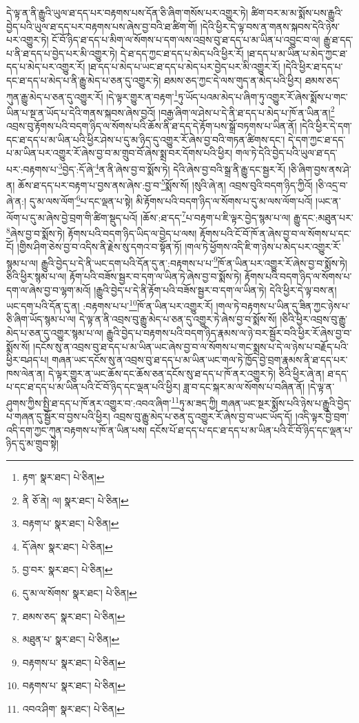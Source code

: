 དེ་ལྟ་ན་ནི་རྒྱུའི་ཡུལ་ཐ་དད་པར་བརྟགས་པས་དོན་ཅི་ཞིག་གསོས་པར་འགྱུར་ཏེ། ཚིག་བར་མ་མ་སྨོས་པས་རྒྱུའི་བྱེད་པའི་ཡུལ་ཐ་དད་པར་བརྟགས་པས་ཞེས་བྱ་བའི་ཐ་ཚིག་གོ། །དེའི་ཕྱིར་དེ་ལྟ་བས་ན་གནས་སྐབས་དེའི་ཉེས་པར་འགྱུར་ཏེ། ངོ་བོ་ཉིད་ཐ་དད་པ་མིག་ལ་སོགས་པ་དག་ལས་འབྲས་བུ་ཐ་དད་པ་མ་ཡིན་པ་འབྱུང་བ་ལ། རྒྱུ་ཐ་དད་པ་ནི་ཐ་དད་པ་བྱེད་པར་མི་འགྱུར་ཏེ། དེ་ཐ་དད་ཀྱང་ཐ་དད་པ་མེད་པའི་ཕྱིར་རོ། །ཐ་དད་པ་མ་ཡིན་པ་མེད་ཀྱང་ཐ་དད་པ་མེད་པར་འགྱུར་རོ། །ཐ་དད་པ་མེད་པ་ཡང་ཐ་དད་པ་མེད་པར་བྱེད་པར་མི་འགྱུར་རོ། །དེའི་ཕྱིར་ཐ་དད་པ་དང་ཐ་དད་པ་མེད་པ་ནི་རྒྱུ་མེད་པ་ཅན་དུ་འགྱུར་ཏེ། ཐམས་ཅད་ཀྱང་དེ་ལས་གུད་ན་མེད་པའི་ཕྱིར། ཐམས་ཅད་ཀུན་རྒྱུ་མེད་པ་ཅན་དུ་འགྱུར་རོ། །དེ་ལྟར་གྱུར་ན་བརྟག་\footnote{རྟག་  སྣར་ཐང་།  པེ་ཅིན། }ཏུ་ཡོད་པའམ་མེད་པ་ཞིག་ཏུ་འགྱུར་རོ་ཞེས་སྨོས་པ་གང་ཡིན་པ་སྔ་ན་ཡོད་པ་དེའི་གནས་སྐབས་ཞེས་བྱའོ། །བརྒྱ་ཞིག་ལ་ཤེས་པ་དེ་ནི་ཐ་དད་པ་མེད་པ་ཁོ་ན་ཡིན་ན།\footnote{ནི  ཅོ་ནེ། ལ།  སྣར་ཐང་།  པེ་ཅིན། } འབྲས་བུ་རྟོགས་པའི་བདག་ཉིད་ལ་སོགས་པའི་ཆོས་ནི་ཐ་དད་དེ་རྟོག་པས་སྒྲོ་བཏགས་པ་ཡིན་ནོ། །དེའི་ཕྱིར་དེ་དག་དང་ཐ་དད་པ་མ་ཡིན་པའི་ཕྱིར་ཤེས་པ་དུ་མ་ཉིད་དུ་འགྱུར་རོ་ཞེས་བྱ་བའི་གཏན་ཚིགས་དང་། དེ་དག་ཀྱང་ཐ་དད་པ་མ་ཡིན་པར་འགྱུར་རོ་ཞེས་བྱ་བ་མ་གྲུབ་བོ་ཞེས་སྨྲ་བར་དོགས་པའི་ཕྱིར། གལ་ཏེ་དེའི་བྱེད་པའི་ཡུལ་ཐ་དད་པར་:བརྟགས་པ་\footnote{བརྟག་པ་  སྣར་ཐང་།  པེ་ཅིན། }བྱེད་:དོ་ཞེ་\footnote{དོ་ཞེས་  སྣར་ཐང་།  པེ་ཅིན། }ན་ནི་ཞེས་བྱ་བ་སྨོས་ཏེ། དེའི་ཞེས་བྱ་བའི་སྒྲ་ནི་རྒྱུ་དང་སྦྱར་རོ། །ཅི་ཞིག་བྱས་ནས་ཤེ་ན། ཆོས་ཐ་དད་པར་བརྟག་པ་བྱས་ནས་ཞེས་:བྱ་བ་\footnote{བྱ་བར་  སྣར་ཐང་།  པེ་ཅིན། }སྨོས་སོ། །སུའི་ཞེ་ན། འབྲས་བུའི་བདག་ཉིད་ཀྱིའོ། །ཅི་འདྲ་བ་ཞེ་ན:། དུ་མ་ལས་ལོག་\footnote{དུ་མ་ལ་སོགས་  སྣར་ཐང་།  པེ་ཅིན། }པ་དང་ལྡན་པ་སྟེ། མི་རྟོགས་པའི་བདག་ཉིད་ལ་སོགས་པ་དུ་མ་ལས་ལོག་པའོ། །ཡང་ན་ལོག་པ་དུ་མ་ཞེས་བྱེ་བྲག་གི་ཚིག་སྡུད་པའོ། །ཆོས་:ཐ་དད་\footnote{ཐམས་ཅད་  སྣར་ཐང་།  པེ་ཅིན། }པ་བརྟག་པ་ཇི་ལྟར་བྱེད་སྙམ་པ་ལ། རྒྱུ་དང་:མཐུན་པར་\footnote{མཐུན་པ་  སྣར་ཐང་།  པེ་ཅིན། }ཞེས་བྱ་བ་སྨོས་ཏེ། རྟོགས་པའི་བདག་ཉིད་ཡིད་ལ་བྱེད་པ་ལས། རྟོགས་པའི་ངོ་བོ་ཁོ་ན་ཞེས་བྱ་བ་ལ་སོགས་པ་དང་ངོ། །གྱིས་ཤིག་ཅེས་བྱ་བ་འདིས་ནི་རྗེས་སུ་དགའ་བ་སྟོན་ཏོ། །གལ་ཏེ་ཕྱོགས་འདི་ཇི་ག་ཉེས་པ་མེད་པར་འགྱུར་རོ་སྙམ་པ་ལ། རྒྱུའི་བྱེད་པ་དེ་ནི་ཡང་དག་པའི་དོན་དུ་ན་:བརྟགས་པ་པ་\footnote{བརྟགས་པ་  སྣར་ཐང་།  པེ་ཅིན། }ཁོ་ན་ཡིན་པར་འགྱུར་རོ་ཞེས་བྱ་བ་སྨོས་ཏེ། ཅིའི་ཕྱིར་སྙམ་པ་ལ། རྟོག་པའི་བཟོས་སྦྱར་བ་དག་ལ་ཡིན་ཏེ་ཞེས་བྱ་བ་སྨོས་ཏེ། རྟོགས་པའི་བདག་ཉིད་ལ་སོགས་པ་དག་ལ་ཞེས་བྱ་བ་ལྷག་མའོ། །རྒྱུའི་བྱེད་པ་དེ་ནི་རྟོག་པའི་བཟོས་སྦྱར་བ་དག་ལ་ཡིན་ཏེ། དེའི་ཕྱིར་དེ་ལྟ་བས་ན། ཡང་དག་པའི་དོན་དུ་ན། :བརྟགས་པ་པ་\footnote{བརྟགས་པ་  སྣར་ཐང་།  པེ་ཅིན། }ཁོ་ན་ཡིན་པར་འགྱུར་རོ། །གལ་ཏེ་བརྟགས་པ་ཡིན་དུ་ཟིན་ཀྱང་ཉེས་པ་ཅི་ཞིག་ཡོད་སྙམ་པ་ལ། དེ་ལྟ་ན་ནི་འབྲས་བུ་རྒྱུ་མེད་པ་ཅན་དུ་འགྱུར་ཏེ་ཞེས་བྱ་བ་སྨོས་སོ། །ཅིའི་ཕྱིར་འབྲས་བུ་རྒྱུ་མེད་པ་ཅན་དུ་འགྱུར་སྙམ་པ་ལ། རྒྱུའི་བྱེད་པ་བརྟགས་པའི་བདག་ཉིད་རྣམས་ལ་ཉེ་བར་སྦྱོར་བའི་ཕྱིར་རོ་ཞེས་བྱ་བ་སྨོས་སོ། །དངོས་སུ་ན་འབྲས་བུ་ཐ་དད་པ་མ་ཡིན་ཡང་ཞེས་བྱ་བ་ལ་སོགས་པ་གང་སྨྲས་པ་དེ་ལ་ཉེས་པ་བརྗོད་པའི་ཕྱིར་བཤད་པ། གཞན་ཡང་དངོས་སུ་ན་འབྲས་བུ་ཐ་དད་པ་མ་ཡིན་ཡང་གལ་ཏེ་ཁྱོད་བྱེ་བྲག་རྣམས་ནི་ཐ་དད་པར་ཁས་ལེན་ན། དེ་ལྟར་གྱུར་ན་ཡང་ཆོས་དང་ཆོས་ཅན་དངོས་སུ་ཐ་དད་པ་ཁོ་ནར་འགྱུར་ཏེ། ཅིའི་ཕྱིར་ཞེ་ན། ཐ་དད་པ་དང་ཐ་དད་པ་མ་ཡིན་པའི་ངོ་བོ་ཉིད་དང་ལྡན་པའི་ཕྱིར། ཟླ་བ་དང་སྐར་མ་ལ་སོགས་པ་བཞིན་ནོ། །དེ་ལྟ་ན་ཤུགས་ཀྱིས་སྤྱི་ཐ་དད་པ་ཁོ་ནར་འགྱུར་བ་:འབའ་ཞིག་\footnote{འབའ་ཤིག་  སྣར་ཐང་།  པེ་ཅིན། }ཏུ་མ་ཟད་ཀྱི། གཞན་ཡང་སྔར་སྨོས་པའི་ཉེས་པ་རྒྱུའི་བྱེད་པ་གཞན་དུ་སྦྱོར་བ་བྱས་པའི་ཕྱིར། འབྲས་བུ་རྒྱུ་མེད་པ་ཅན་དུ་འགྱུར་རོ་ཞེས་བྱ་བ་ཡང་ཡོད་དོ། །འདི་ལྟར་བྱེ་བྲག་འདི་དག་ཀྱང་ཀུན་བརྟགས་པ་ཁོ་ན་ཡིན་པས། དངོས་པོ་ཐ་དད་པ་དང་ཐ་དད་པ་མ་ཡིན་པའི་ངོ་བོ་ཉིད་དང་ལྡན་པ་ཉིད་དུ་མ་གྲུབ་སྟེ། 